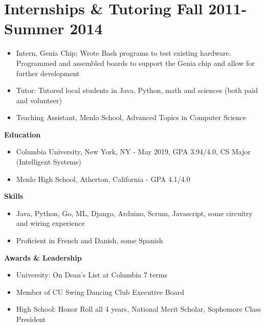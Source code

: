 \documentclass{article}
\begin{document}
\section*{\textbf{Internships \& Tutoring \hfill Fall 2011- Summer 2014
}}
\begin{itemize}[noitemsep]
    \item Intern, Genia Chip; Wrote Bash programs to test existing hardware. Programmed and assembled boards to support the Genia chip and allow for further development
    \item Tutor: Tutored local students in Java, Python, math and sciences (both paid and volunteer)
    \item Teaching Assistant, Menlo School, Advanced Topics in Computer Science
\end{itemize}

\noindent
{\large\textbf{Education}}
\begin{itemize}[noitemsep]
    \item Columbia University, New York, NY - May 2019, GPA 3.94/4.0, CS Major (Intelligent Systems)
    \item Menlo High School, Atherton, California - GPA 4.1/4.0
\end{itemize}

\noindent
{\large\textbf{Skills}}
\begin{itemize}[noitemsep]
    \item Java, Python, Go, ML, Django, Arduino, Scrum, Javascript, some circuitry and wiring experience
    \item Proficient in French and Danish, some Spanish
\end{itemize}
\noindent
{\large\textbf{Awards \& Leadership}}
\begin{itemize}[noitemsep]
    \item University: On Dean’s List at Columbia 7 terms
    \item Member of CU Swing Dancing Club Executive Board
    \item High School: Honor Roll all 4 years, National Merit Scholar, Sophomore Class President

\end{itemize}
\end{document}
